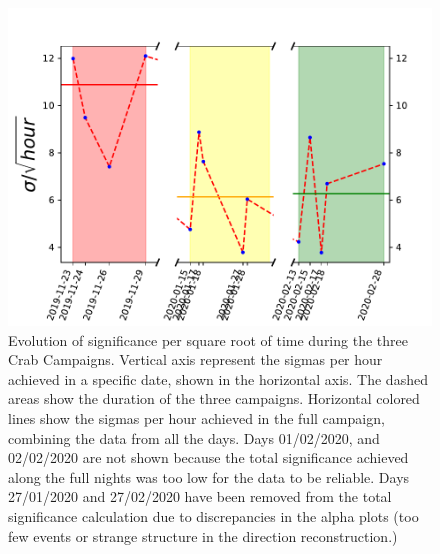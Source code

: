 \documentclass[main.tex]{subfiles}
\begin{document}
\begin{figure}[h!]
\centering
 \includegraphics[width=\textwidth]{Pictures/daily_sigmas.pdf}
  \caption{Evolution of significance per square root of time during the three Crab Campaigns. Vertical axis represent the sigmas per hour achieved in a specific date, shown in the horizontal axis. The dashed areas show the duration of the three campaigns. Horizontal colored lines show the sigmas per hour achieved in the full campaign, combining the data from all the days. Days 01/02/2020, and 02/02/2020 are not shown because the total significance achieved along the full nights was too low for the data to be reliable. Days 27/01/2020 and 27/02/2020 have been removed from the total significance calculation due to discrepancies in the alpha plots (too few events or strange structure in the direction reconstruction.)}
    \label{fig:sig_evolution}
\end{figure}
\end{document}
